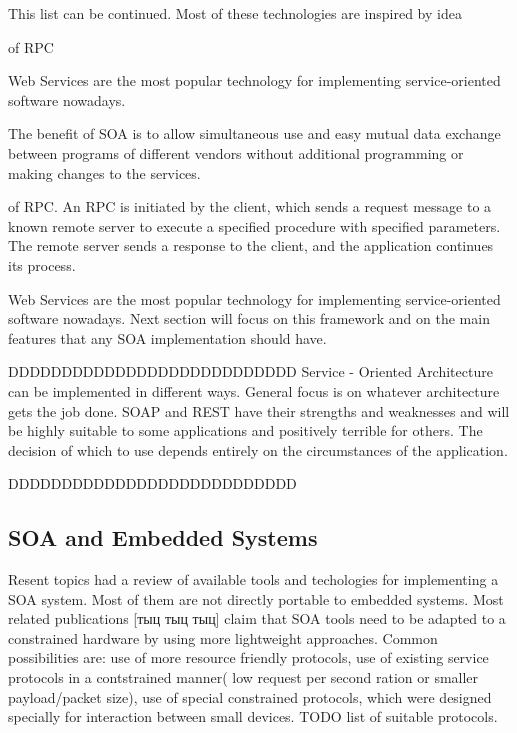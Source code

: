 This list can be continued. Most of these technologies are inspired by idea

of \gls{RPC}

Web Services are the most popular technology for implementing
service-oriented software nowadays.



 The benefit of SOA is
to allow simultaneous use and easy mutual data exchange between programs of different vendors without additional programming or making changes to the services.

of \gls{RPC}. An \gls{RPC} is initiated by the client, which sends a request
message to a known remote server to execute a specified procedure with specified
parameters. The remote server sends a response to the client, and the application continues its process.

Web Services are the most popular technology for implementing
service-oriented software nowadays. Next section will focus on this framework
and on the main features that any \gls{SOA} implementation should have.




DDDDDDDDDDDDDDDDDDDDDDDDDDD
Service
-
Oriented Architecture can be implemented in different ways. General focus is on
whatever architecture gets the job done. SOAP and REST have their strengths and weaknesses
and will be highly suitable to some
applications and positively terrible for others. The decision of
which to use depends entirely on the circumstances of the application.

DDDDDDDDDDDDDDDDDDDDDDDDDDD

\subsection{SOA and Embedded Systems}

Resent topics had a review of available tools and techologies for implementing a
\gls{SOA} system. Most of them are not directly portable to embedded systems.
Most related publications [тыц тыц тыц] claim that SOA tools need to be adapted
to a constrained hardware by using more lightweight approaches.
Common possibilities are: use of more resource friendly protocols, use of
existing service protocols in a contstrained manner( low request per second
ration or smaller payload/packet size), use of special constrained protocols,
which were designed specially for interaction between small devices.
TODO list of suitable  protocols.

